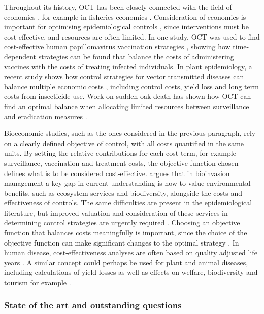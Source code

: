 Throughout its history, OCT has been closely connected with the field of economics \citep{weber_optimal_2011}, for example in fisheries economics \citep{clark_economics_1975}. Consideration of economics is important for optimising epidemiological controls \citep{perrings_merging_2014}, since interventions must be cost-effective, and resources are often limited. In one study, OCT was used to find cost-effective human papillomavirus vaccination strategies \citep{brown_role_2011}, showing how time-dependent strategies can be found that balance the costs of administering vaccines with the costs of treating infected individuals. In plant epidemiology, a recent study shows how control strategies for vector transmitted diseases can balance multiple economic costs \citep{bokil_optimal_2019}, including control costs, yield loss and long term costs from insecticide use. Work on sudden oak death has shown how OCT can find an optimal balance when allocating limited resources between surveillance and eradication measures \citep{ndeffo_mbah_balancing_2010}.

Bioeconomic studies, such as the ones considered in the previous paragraph, rely on a clearly defined objective of control, with all costs quantified in the same units. By setting the relative contributions for each cost term, for example surveillance, vaccination and treatment costs, the objective function chosen defines what is to be considered cost-effective. \citet{epanchin-niell_economics_2017} argues that in bioinvasion management a key gap in current understanding is how to value environmental benefits, such as ecosystem services and biodiversity, alongside the costs and effectiveness of controls. The same difficulties are present in the epidemiological literature, but improved valuation and consideration of these services in determining control strategies are urgently required \citep{boyd_consequence_2013}. Choosing an objective function that balances costs meaningfully is important, since the choice of the objective function can make significant changes to the optimal strategy \citep{probert_decision_2016}. In human disease, cost-effectiveness analyses are often based on quality adjusted life years \citep{whitehead_health_2010}. A similar concept could perhaps be used for plant and animal diseases, including calculations of yield losses \citep{savary_crop_2012, savary_global_2019} as well as effects on welfare, biodiversity and tourism for example \citep{boyd_consequence_2013}.

\subsubsection{State of the art and outstanding questions}

